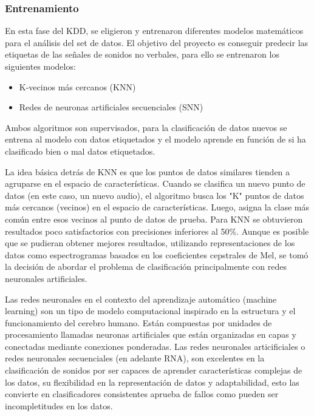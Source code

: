 \subsubsection{Entrenamiento}
En esta fase del KDD, se eligieron y entrenaron diferentes modelos matemáticos para el análisis del set de datos. El objetivo del proyecto es conseguir predecir las etiquetas de las señales de sonidos no verbales, para ello se entrenaron los siguientes modelos:
\begin{itemize}
    \item K-vecinos más cercanos (KNN)
    \item Redes de neuronas artificiales secuenciales (SNN)
\end{itemize}
Ambos algoritmos son supervisados, para la clasificación de datos nuevos se entrena al modelo con datos etiquetados y el modelo aprende en función de si ha clasificado bien o mal datos etiquetados.

La idea básica detrás de KNN es que los puntos de datos similares tienden a agruparse en el espacio de características. Cuando se clasifica un nuevo punto de datos (en este caso, un nuevo audio), el algoritmo busca los "K" puntos de datos más cercanos (vecinos) en el espacio de características. Luego, asigna la clase más común entre esos vecinos al punto de datos de prueba. Para KNN se obtuvieron resultados poco satisfactorios con precisiones inferiores al 50\%. Aunque es posible que se pudieran obtener mejores resultados, utilizando representaciones de los datos como espectrogramas basados en los coeficientes cepstrales de Mel, se tomó la decisión de abordar el problema de clasificación principalmente con redes neuronales artificiales.

Las redes neuronales en el contexto del aprendizaje automático (machine learning) son un tipo de modelo computacional inspirado en la estructura y el funcionamiento del cerebro humano. Están compuestas por unidades de procesamiento llamadas neuronas artificiales que están organizadas en capas y conectadas mediante conexiones ponderadas. Las redes neuronales articificiales o redes neuronales secuenciales (en adelante RNA), son excelentes en la clasificación de sonidos por ser capaces de aprender características complejas de los datos, su flexibilidad en la representación de datos y adaptabilidad, esto las convierte en clasificadores consistentes aprueba de fallos como pueden ser incompletitudes en los datos.


